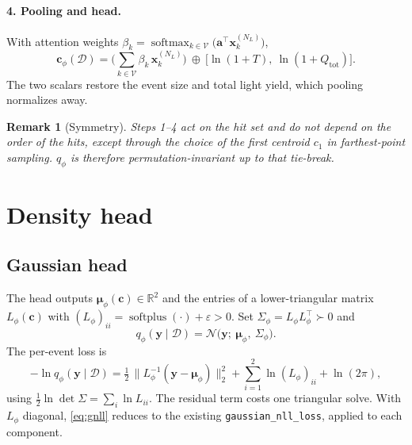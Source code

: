 \documentclass[11pt]{article}
\newtheorem{remark}{Remark}
\theoremstyle{definition}
\newcommand{\D}{\mathcal{D}}
\newcommand{\y}{\bm{y}}
\newcommand{\R}{\mathbb{R}}
\DeclareMathOperator{\softmax}{softmax}
\DeclareMathOperator{\softplus}{softplus}
\begin{document}
\paragraph{4. Pooling and head.}
With attention weights $\beta_k = \softmax_{k\in\mathcal{V}}\big(\bm{a}^{\top}\bm{x}_k^{(N_L)}\big)$,
\begin{equation}
  \bm{c}_\phi(\D) = \Big(\sum_{k\in\mathcal{V}}\beta_k\,\bm{x}_k^{(N_L)}\Big)\ \oplus\ \big[\ln(1+T),\ \ln(1+Q_{\text{tot}})\big].
\end{equation}
The two scalars restore the event size and total light yield, which pooling normalizes away.

\begin{remark}[Symmetry]
Steps 1--4 act on the hit \emph{set} and do not depend on the order of the hits, except
through the choice of the first centroid $c_1$ in farthest-point sampling. $q_\phi$ is
therefore permutation-invariant up to that tie-break.
\end{remark}

\section{Density head}

\subsection{Gaussian head}
The head outputs $\bm{\mu}_\phi(\bm{c})\in\R^{2}$ and the entries of a lower-triangular matrix
$L_\phi(\bm{c})$ with $(L_\phi)_{ii} = \softplus(\cdot)+\varepsilon>0$. Set
$\Sigma_\phi = L_\phi L_\phi^{\top}\succ 0$ and
\begin{equation}
  q_\phi(\y\mid\D) = \mathcal{N}\big(\y;\ \bm{\mu}_\phi,\ \Sigma_\phi\big).
\end{equation}
The per-event loss is
\begin{equation}
  -\ln q_\phi(\y\mid\D)
  = \tfrac12\,\big\|L_\phi^{-1}(\y-\bm{\mu}_\phi)\big\|_2^2 + \sum_{i=1}^{2}\ln (L_\phi)_{ii} + \ln(2\pi),
  \label{eq:gnll}
\end{equation}
using $\tfrac12\ln\det\Sigma = \sum_i\ln L_{ii}$. The residual term costs one triangular solve.
With $L_\phi$ diagonal, \eqref{eq:gnll} reduces to the existing \texttt{gaussian\_nll\_loss},
applied to each component.
\end{document}
